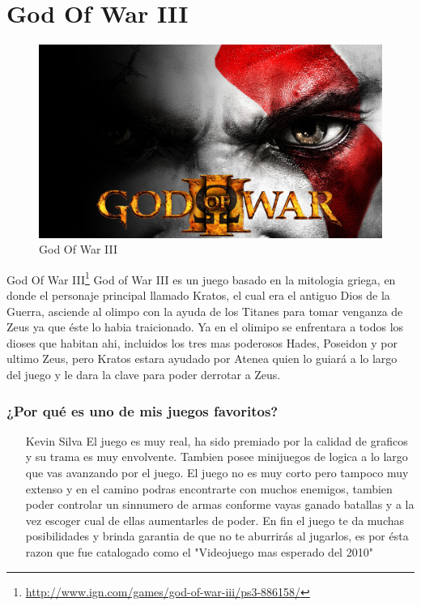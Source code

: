 \section{God Of War III}

\begin{figure}[htbp]
\begin{center}
\includegraphics[width=.60\textwidth]{./imagenes/godofwar3.jpg}
\caption{God Of War III}
\label{God Of War III}
\end{center}
\end{figure}
God Of War III\footnote{\url{http://www.ign.com/games/god-of-war-iii/ps3-886158/}} God of War III es un juego basado en la mitologia griega, en donde el personaje principal llamado Kratos, el cual era el antiguo Dios de la Guerra, asciende al olimpo con la ayuda de los Titanes para tomar venganza de Zeus ya que éste lo habia traicionado. Ya en el olimipo se enfrentara a todos los dioses que habitan ahi, incluidos los tres mas poderosos Hades, Poseidon y por ultimo Zeus, pero Kratos estara ayudado por Atenea quien lo guiará a lo largo del juego y le dara la clave para poder derrotar a Zeus. 

\subsubsection{¿Por qué es uno de mis juegos favoritos?}
\begin{itemize}
\item[Kevin Silva] El juego es muy real, ha sido premiado por la calidad de graficos y su trama es muy envolvente. Tambien posee minijuegos de logica a lo largo que vas avanzando por el juego. El juego no es muy corto pero tampoco muy extenso y en el camino podras encontrarte con muchos enemigos, tambien poder controlar un sinnumero de armas conforme vayas ganado batallas y a la vez escoger cual de ellas aumentarles de poder. En fin el juego te da muchas posibilidades y brinda garantia de que no te aburrirás al jugarlos, es por ésta razon que fue catalogado como el "Videojuego mas esperado del 2010"  
\end{itemize}
